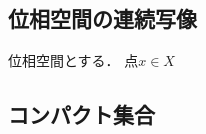 \documentclass[../sotsu.tex]{subfiles}
\begin{document}
\subsection{位相空間の連続写像}

\begin{definition}
    位相空間とする．
    点$x \in X$
\end{definition}



\subsection{コンパクト集合}







\end{document}
